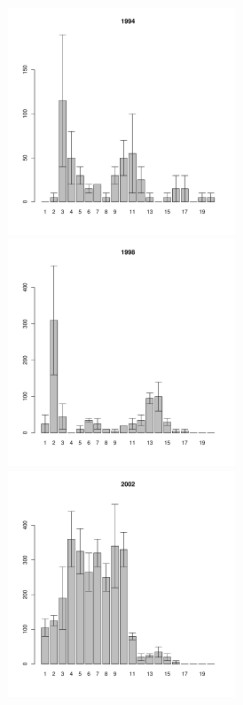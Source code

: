 \documentclass[12pt, a4paper]{article}
\begin{document}
\begin{figure}[h]

\begin{multicols}{3}
\hfill
\includegraphics[width=60mm]{../White_Sea/Ryashkov_ZRS/zrs_1994_.pdf}
\hfill
\includegraphics[width=60mm]{../White_Sea/Ryashkov_ZRS/zrs_1998_.pdf}
\hfill
\includegraphics[width=60mm]{../White_Sea/Ryashkov_ZRS/zrs_2002_.pdf}
\end{multicols}




\end{figure}
\end{document}
